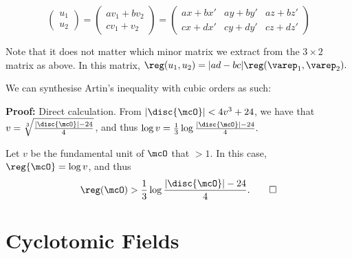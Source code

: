 \documentclass[a4paper, 12pt,oneside,openany]{book}
\begin{document}
$$\begin{pmatrix} u_1 \\ u_2 \end{pmatrix} = \begin{pmatrix} av_1+bv_2 \\ cv_1+v_2 \end{pmatrix} = \begin{pmatrix} ax+bx' & ay+by' & az+bz' \\ cx+dx' & cy+dy' & cz+dz'\end{pmatrix}$$

Note that it does not matter which minor matrix we extract from the $3\times2$ matrix as above. In this matrix, $\reg(u_1, u_2) = |ad-bc| \reg(\varep_1, \varep_2).$

We can synthesise Artin's inequality with cubic orders as such:


\textbf{Proof:} Direct calculation. From $|\disc{\mcO}|<4v^3+24$, we have that $v=\sqrt[3]{\frac{|\disc{\mcO}|-24}{4}}$, and thus $\log v = \frac{1}{3}\log{\frac{|\disc{\mcO}|-24}{4}}.$ 

Let $v$ be the fundamental unit of $\mcO$ that $>1$. In this case, $\reg{\mcO}=\log v$, and thus $$\reg(\mcO) > \frac{1}{3}\log{\frac{|\disc{\mcO}|-24}{4}}. \qed$$




\newpage

\chapter{Cyclotomic Fields}
\minitoc
\end{document}
